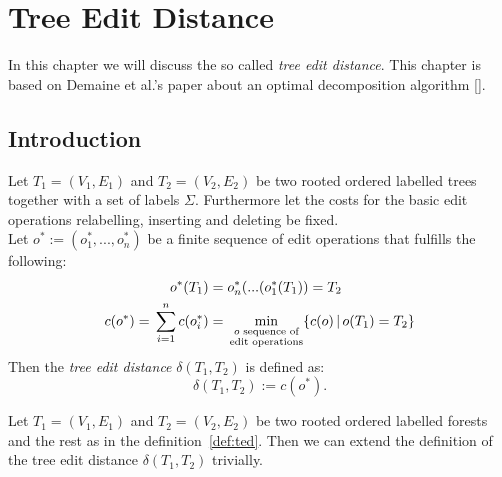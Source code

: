 \chapter{Tree Edit Distance}
In this chapter we will discuss the so called \textit{tree edit distance}. This chapter is based on Demaine et al.'s paper about an optimal decomposition algorithm []. 

\section{Introduction} 
\begin{defin} \label{def:ted}
Let $T_1=(V_1,E_1)$ and $T_2=(V_2,E_2)$ be two rooted ordered labelled trees together with a set of labels $\Sigma$. Furthermore let the costs for the basic edit operations relabelling, inserting and deleting be fixed. \\
Let $o^*:= (o^*_1,...,o^*_n)$ be a finite sequence of edit operations that fulfills the following:
\begin{align*}
o^*(T_1) &= o^*_n(...(o^*_1(T_1)) = T_2 \\
c(o^*) = \sideset{}{}\sum_{i=1}^n c(o^*_i) &= \sideset{}{}\min_{\substack{o\text{ sequence of}\\ \text{edit operations}}} \{c(o)\,|\,o(T_1)=T_2\}
\end{align*}
Then the \textit{tree edit distance} $\delta(T_1,T_2)$ is defined as:
$$\delta(T_1,T_2) := c(o^*).$$
\end{defin}
\begin{defin}
Let $T_1=(V_1,E_1)$ and $T_2=(V_2,E_2)$ be two rooted ordered labelled forests and the rest as in the definition~\ref{def:ted}. Then we can extend the definition of the tree edit distance $\delta(T_1,T_2)$ trivially. 
\end{defin}

